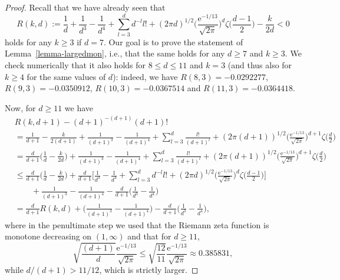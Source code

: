 \documentclass[a4paper, oneside, 11pt]{amsart}
\newcommand{\e}{\mathrm e}
\theoremstyle{definition}
\newcommand{\1}{\mathbbm{1}}
\newcommand{\0}{\mathbf{o}}
\numberwithin{equation}{section}
\begin{document}
\begin{proof}
    Recall that we have already seen that
    \[ 
    R(k,d)
    :=
    \frac{1}{d} + \frac{1}{d^3} -\frac{1}{d^4} + \sum_{l=3}^d d^{-l} l! +  (2\pi d)^{1/2} \Big( \frac{\e^{-1/13}}{\sqrt{2\pi}} \Big)^d \zeta\Big( \frac{d-1}{2} \Big) - \frac{k}{2d} < 0  
    \]
    holds for any $k\geq 3$ if $d=7$. 
    Our goal is to prove the statement of Lemma~\ref{lemma-largedmon}, i.e., that the same holds for any $d \geq 7$ and $k\geq 3$. We check numerically that it also holds for $8 \leq d \leq 11$ and $k=3$ (and thus also for $k\geq 4$ for the same values of $d$): indeed, we have $R(8,3)=-0.0292277$, $R(9,3)=-0.0350912$, $R(10,3)=-0.0367514$ and $R(11,3)=-0.0364418$. 

    Now,  for $d \geq 11$ we have
   \begin{equation} \label{inequ}
    \begin{aligned}
            & 
            R(k,d+1)-(d+1)^{-(d+1)}(d+1)! 
            \\ 
            &=
            \frac{1}{d+1}- \frac{k}{2(d+1)} + \frac{1}{(d+1)^3} -\frac{1}{(d+1)^4} + \sum_{l=3}^{d} \frac{ l!}{(d+1)^l} +  (2\pi (d+1))^{1/2} \Big( \tfrac{\e^{-1/13}}{\sqrt{2\pi}} \Big)^{d+1} \zeta\Big( \frac{d}{2} \Big)
            \\
            &=
            \frac{d}{d+1} \Big( \frac{1}{d}- \frac{k}{2d} \Big) + \frac{1}{(d+1)^3} -\frac{1}{(d+1)^4} + \sum_{l=3}^{d} \frac{ l!}{(d+1)^l} +  (2\pi (d+1))^{1/2} \Big( \tfrac{\e^{-1/13}}{\sqrt{2\pi}} \Big)^{d+1} \zeta\Big( \frac{d}{2} \Big)
            \\ 
           &  \leq
            \frac{d}{d+1} \Big( \frac{1}{d}- \frac{k}{2d} \Big) + \frac{d}{d+1} \bigg[ \frac{1}{d^3} -\frac{1}{d^4} + \sum_{l=3}^d d^{-l} l! +  (2\pi d)^{1/2} \Big( \tfrac{\e^{-1/13}}{\sqrt{2\pi}} \Big)^d \zeta\Big( \frac{d-1}{2} \Big) \bigg]  
            \\ & \qquad    + \frac{1}{(d+1)^3} -\frac{1}{(d+1)^4} - \frac{d}{d+1} \big( \frac{1}{d^3}-\frac{1}{d^4} \big) 
            \\ 
            &  =
            \frac{d}{d+1} R(k,d) + \Big( \frac{1}{(d+1)^3} - \frac{1}{(d+1)^4} \Big) - \frac{d}{d+1} \big( \frac{1}{d^3}-\frac{1}{d^4} \big) , 
    \end{aligned}
    \end{equation}
    where in the penultimate step we used that the Riemann zeta function is monotone decreasing on $(1,\infty)$ and that for $d \geq 11$,
    \begin{equation*} 
        \sqrt{\frac{(d+1)}{ d}} \frac{\e^{-1/13}}{\sqrt{2\pi}} \leq \sqrt{\frac{12}{11}} \frac{\e^{-1/13}}{\sqrt{2\pi}}  \approx 0.385831, 
    \end{equation*}
    while $d/(d+1)>11/12$, which is strictly larger. 


\end{proof}
\end{document}
